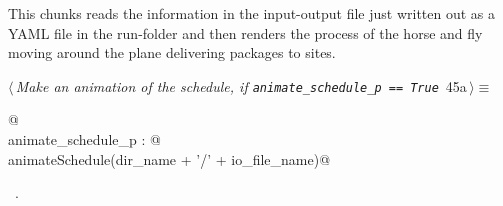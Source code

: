 \documentclass[11.5pt]{report}
\begin{document}
\vspace{-0.8cm} \newchunk This chunks reads the information in the input-output file just written out as
a YAML file in the run-folder and then renders the process of the horse and fly moving around the plane 
delivering packages to sites. 

\begin{flushleft} \small
\begin{minipage}{\linewidth}\label{scrap62}\raggedright\small
{} $\langle\,${\itshape Make an animation of the schedule, if \verb|animate_schedule_p == True|}\nobreak\ {\footnotesize {45a}}$\,\rangle\equiv$
\vspace{-1ex}
\begin{list}{}{} \item
\mbox{}\verb@   @\\
\mbox{}\verb@if animate_schedule_p : @\\
\mbox{}\verb@     animateSchedule(dir_name + '/' + io_file_name)@\\
\mbox{}\verb@@{\NWsep}
\end{list}
\vspace{-1.5ex}
\footnotesize
\begin{list}{}{\setlength{\itemsep}{-\parsep}\setlength{\itemindent}{-\leftmargin}}
\item \NWtxtMacroRefIn\ .

\item{}
\end{list}
\end{minipage}\vspace{4ex}
\end{flushleft}

\vspace{-0.8cm}\newchunk 
\end{document}
